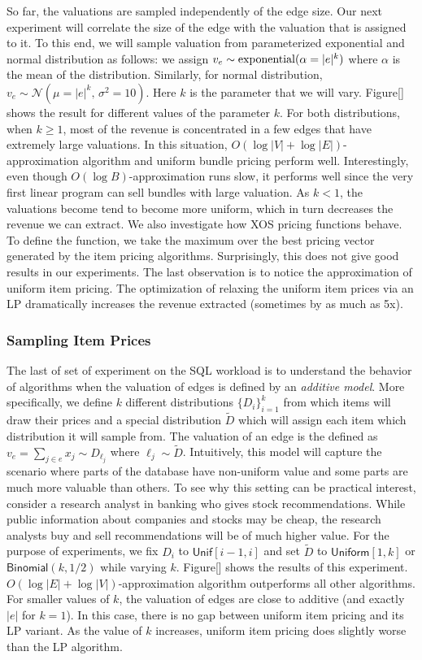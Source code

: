 \smallskip
{} So far, the valuations are sampled independently of the edge size. Our next experiment will correlate the size of the edge with the valuation that is assigned to it. To this end, we will sample valuation from parameterized exponential and normal distribution as follows: we assign $v_e \sim {\rm exponential}(\alpha = |e|^k)$ where $\alpha$ is the mean of the distribution. Similarly, for normal distribution, $v_e \sim \mathcal{N}(\mu = |e|^k,\, \sigma^2 = 10)$. Here $k$ is the parameter that we will vary. Figure[] shows the result for different values of the parameter $k$. For both distributions, when $k \geq 1$, most of the revenue is concentrated in a few edges that have extremely large valuations. In this situation, $O(\log |V| + \log |E|)$-approximation algorithm and uniform bundle pricing perform well. Interestingly, even though $O(\log B)$-approximation runs slow, it performs well since the very first linear program can sell bundles with large valuation. As $k < 1$, the valuations become tend to become more uniform, which in turn decreases the revenue we can extract. We also investigate how XOS pricing functions behave. To define the function, we take the maximum over the best pricing vector generated by the item pricing algorithms. Surprisingly, this does not give good results in our experiments. The last observation is to notice the approximation of uniform item pricing. The optimization of relaxing the uniform item prices via an LP dramatically increases the revenue extracted (sometimes by as much as 5x).

\subsubsection{Sampling Item Prices} The last of set of experiment on the SQL workload is to understand the behavior of algorithms when the valuation of edges is defined by an \emph{additive model}. More specifically, we define $k$ different distributions $\{D_i\}_{i=1}^{k}$ from which items will draw their prices and a special distribution $\tilde{D}$ which will assign each item which distribution it will sample from. The valuation of an edge is the defined as $v_e = \sum_{j \in e} x_j \sim D_{\ell_j}$ where $\ell_j \sim \tilde{D}$. Intuitively, this model will capture the scenario where parts of the database have non-uniform value and some parts are much more valuable than others. To see why this setting can be practical interest, consider a research analyst in banking who gives stock recommendations. While public information about companies and stocks may be cheap, the research analysts buy and sell recommendations will be of much higher value. For the purpose of experiments, we fix $D_i$ to $\textsf{Unif}[i-1, i]$ and set $\tilde{D}$ to $\textsf{Uniform}[1, k]$ or $\textsf{Binomial}(k, 1/2)$ while varying $k$. Figure[] shows the results of this experiment. $O(\log |E| + \log |V|)$-approximation algorithm outperforms all other algorithms. For smaller values of $k$, the valuation of edges are close to additive (and exactly $|e|$ for $k=1$). In this case, there is no gap between uniform item pricing and its LP variant. As  the value of $k$ increases, uniform item pricing does slightly worse than the LP algorithm.


